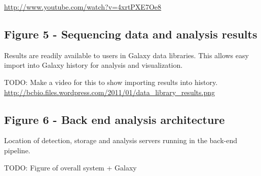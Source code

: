 \documentclass[10pt]{bmc_article}
\newenvironment{bmcformat}{\begin{raggedright}\baselineskip20pt\sloppy\setboolean{publ}{false}}{\end{raggedright}\baselineskip20pt\sloppy}
\begin{document}
\begin{bmcformat}
\url{http://www.youtube.com/watch?v=4xrtPXE7Oe8}

\subsection*{Figure 5 - Sequencing data and analysis results}
Results are readily available to users in Galaxy data libraries. This
allows easy import into Galaxy history for analysis and visualization.

TODO: Make a video for this to show importing results into
history.
\url{http://bcbio.files.wordpress.com/2011/01/data_library_results.png}

\subsection*{Figure 6 - Back end analysis architecture}
Location of detection, storage and analysis servers running in the
back-end pipeline.

TODO: Figure of overall system + Galaxy
\end{bmcformat}
\end{document}
